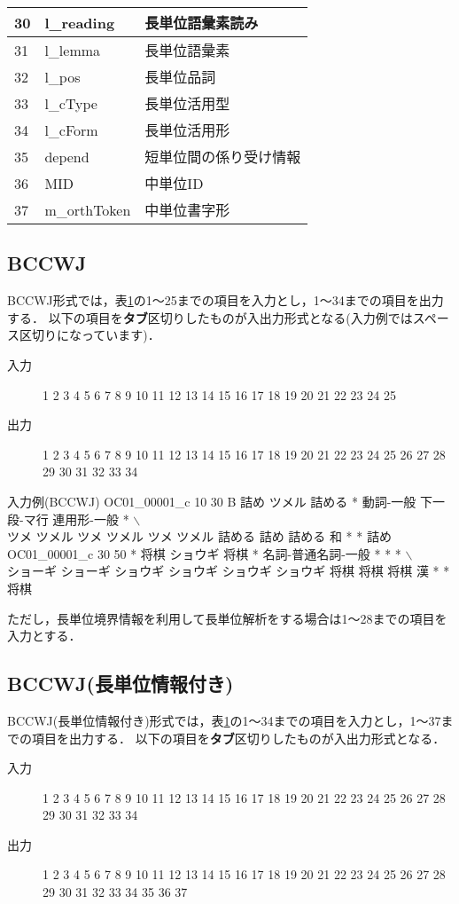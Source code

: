 \documentclass[titlepage]{jarticle}
\begin{document}
\begin{table}[!ht]
\begin{center}
\begin{tabular}{|l|l|l|}
30 & l\_reading & 長単位語彙素読み \\ \hline
31 & l\_lemma & 長単位語彙素 \\ \hline
32 & l\_pos & 長単位品詞 \\ \hline
33 & l\_cType & 長単位活用型 \\ \hline
34 & l\_cForm & 長単位活用形 \\ \hline
35 & depend & 短単位間の係り受け情報 \\ \hline
36 & MID & 中単位ID \\ \hline
37 & m\_orthToken & 中単位書字形 \\ \hline
\end{tabular}
\label{item_list}
\end{center}
\end{table}


\subsection{BCCWJ}
BCCWJ形式では，表\ref{item_list}の1～25までの項目を入力とし，1～34までの項目を出力する．
以下の項目を\textbf{タブ}区切りしたものが入出力形式となる(入力例ではスペース区切りになっています)．
\begin{description}
\item[入力] 1 2 3 4 5 6 7 8 9 10 11 12 13 14 15 16 17 18 19 20 21 22 23 24 25
\item[出力] 1 2 3 4 5 6 7 8 9 10 11 12 13 14 15 16 17 18 19 20 21 22 23 24 25 26 27 28 29 30 31 32 33 34
\end{description}
\begin{itembox}[l]{入力例(BCCWJ)}
\small
OC01\_00001\_c 10 30 B 詰め ツメル 詰める * 動詞-一般 下一段-マ行 連用形-一般 * $\backslash$ \\ 
ツメ ツメル ツメ ツメル ツメ ツメル 詰める 詰め 詰める 和 * * 詰め\\
OC01\_00001\_c 30 50 * 将棋 ショウギ 将棋 * 名詞-普通名詞-一般 * * * $\backslash$ \\
ショーギ ショーギ ショウギ ショウギ ショウギ ショウギ 将棋 将棋 将棋 漢 * * 将棋
\end{itembox}

ただし，長単位境界情報を利用して長単位解析をする場合は1～28までの項目を入力とする．


\subsection{BCCWJ(長単位情報付き)}
BCCWJ(長単位情報付き)形式では，表\ref{item_list}の1～34までの項目を入力とし，1～37までの項目を出力する．
以下の項目を\textbf{タブ}区切りしたものが入出力形式となる．
\begin{description}
\item[入力] 1 2 3 4 5 6 7 8 9 10 11 12 13 14 15 16 17 18 19 20 21 22 23 24 25 26 27 28 29 30 31 32 33 34
\item[出力] 1 2 3 4 5 6 7 8 9 10 11 12 13 14 15 16 17 18 19 20 21 22 23 24 25 26 27 28 29 30 31 32 33 34 35 36 37
\end{description}
\end{document}
